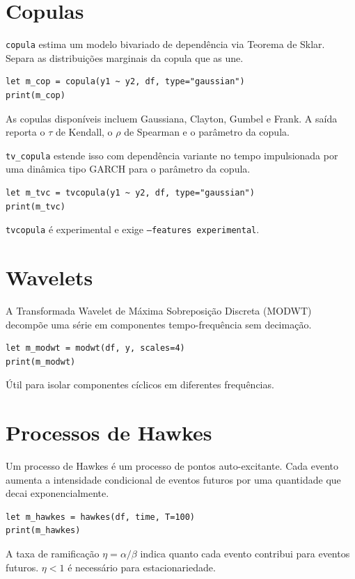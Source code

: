\section{Copulas}

\texttt{copula} estima um modelo bivariado de dependência via Teorema de
Sklar. Separa as distribuições marginais da copula que as une.

\begin{lstlisting}[caption={Copula}]
let m_cop = copula(y1 ~ y2, df, type="gaussian")
print(m_cop)
\end{lstlisting}

As copulas disponíveis incluem Gaussiana, Clayton, Gumbel e Frank. A
saída reporta o $\tau$ de Kendall, o $\rho$ de Spearman e o parâmetro
da copula.

\texttt{tv\_copula} estende isso com dependência variante no tempo impulsionada
por uma dinâmica tipo GARCH para o parâmetro da copula.

\begin{lstlisting}[caption={Copula de dependência variante no tempo}]
let m_tvc = tvcopula(y1 ~ y2, df, type="gaussian")
print(m_tvc)
\end{lstlisting}

\texttt{tvcopula} é experimental e exige \texttt{--features experimental}.

\section{Wavelets}

A Transformada Wavelet de Máxima Sobreposição Discreta (MODWT)
decompõe uma série em componentes tempo-frequência sem decimação.

\begin{lstlisting}[caption={MODWT}]
let m_modwt = modwt(df, y, scales=4)
print(m_modwt)
\end{lstlisting}

Útil para isolar componentes cíclicos em diferentes frequências.

\section{Processos de Hawkes}

Um processo de Hawkes é um processo de pontos auto-excitante. Cada
evento aumenta a intensidade condicional de eventos futuros por uma
quantidade que decai exponencialmente.

\begin{lstlisting}[caption={Processo de Hawkes}]
let m_hawkes = hawkes(df, time, T=100)
print(m_hawkes)
\end{lstlisting}

A taxa de ramificação $\eta = \alpha / \beta$ indica quanto cada
evento contribui para eventos futuros. $\eta < 1$ é necessário para
estacionariedade.

